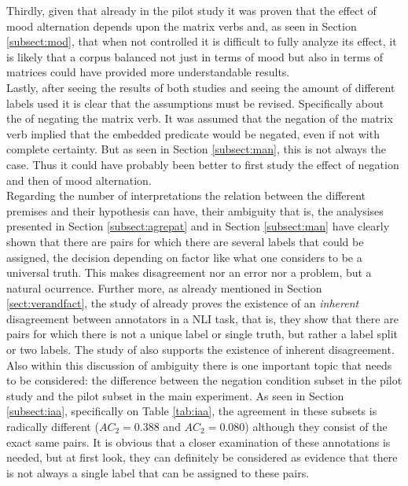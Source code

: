 Thirdly, given that already in the pilot study it was proven that the effect of mood alternation depends upon the matrix verbs and, as seen in Section \ref{subsect:mod}, that when not controlled it is difficult to fully analyze its effect, it is likely that a corpus balanced not just in terms of mood but also in terms of matrices could have provided more understandable results.\\

Lastly, after seeing the results of both studies and seeing the amount of different labels used it is clear that the assumptions must be revised. Specifically about the of negating the matrix verb. It was assumed that the negation of the matrix verb implied that the embedded predicate would be negated, even if not with complete certainty. But as seen in Section \ref{subsect:man}, this is not always the case. Thus it could have probably been better to first study the effect of negation and then of mood alternation.\\

Regarding the number of interpretations the relation between the different premises and their hypothesis can have, their ambiguity that is, the analysises presented in Section \ref{subsect:agrepat} and in Section \ref{subsect:man} have clearly shown that there are pairs for which there are several labels that could be assigned, the decision depending on factor like what one considers to be a universal truth. This makes disagreement nor an error nor a problem, but a natural ocurrence. Further more, as already mentioned in Section \ref{sect:verandfact}, the study of \citet{pavlick2019inherent} already proves the existence of an \textit{inherent} disagreement between annotators in a NLI task, that is, they show that there are pairs for which there is not a unique label or single truth, but rather a label split or two labels. The study of \citet{nie2020can} also supports the existence of inherent disagreement.\\

Also within this discussion of ambiguity there is one important topic that needs to be considered: the difference between the negation condition subset in the pilot study and the pilot subset in the main experiment. As seen in Section \ref{subsect:iaa}, specifically on Table \ref{tab:iaa}, the agreement in these subsets is radically different ($AC_2=0.388$ and $AC_2=0.080$) although they consist of the exact same pairs. It is obvious that a closer examination of these annotations is needed, but at first look, they can definitely be considered as evidence that there is not always a single label that can be assigned to these pairs.\\

